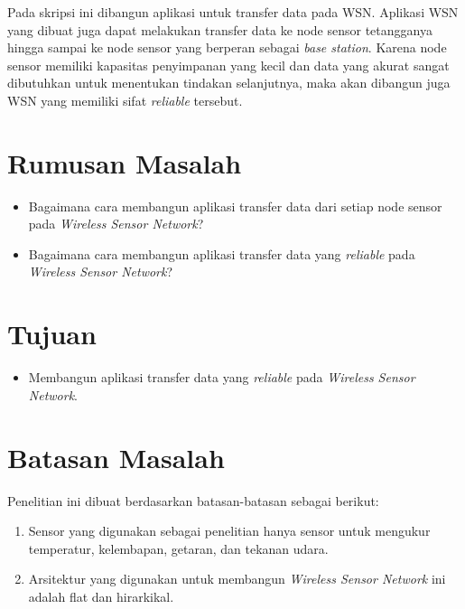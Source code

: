 Pada skripsi ini dibangun aplikasi untuk transfer data pada WSN. Aplikasi WSN yang dibuat juga dapat melakukan transfer data ke node sensor tetangganya hingga sampai ke node sensor yang berperan sebagai \textit{base station}. Karena node sensor memiliki kapasitas penyimpanan yang kecil dan data yang akurat sangat dibutuhkan untuk menentukan tindakan selanjutnya, maka akan dibangun juga WSN yang memiliki sifat \textit{reliable} tersebut.


\section{Rumusan Masalah}
\label{sec:rumusan}
\begin{itemize}
	\item Bagaimana cara membangun aplikasi transfer data dari setiap node sensor pada \textit{Wireless Sensor Network}?
	\item Bagaimana cara membangun aplikasi transfer data yang \textit{reliable} pada \textit{Wireless Sensor Network}?
\end{itemize}

\section{Tujuan}
\label{sec:tujuan}
\begin{itemize}
 \item Membangun aplikasi transfer data yang \textit{reliable} pada \textit{Wireless Sensor Network}.
\end{itemize}

\section{Batasan Masalah}
\label{sec:batasan}
Penelitian ini dibuat berdasarkan batasan-batasan sebagai berikut:
\begin{enumerate}
	\item Sensor yang digunakan sebagai penelitian hanya sensor untuk mengukur temperatur, kelembapan, getaran, dan tekanan udara.
	\item Arsitektur yang digunakan untuk membangun \textit{Wireless Sensor Network} ini adalah flat dan hirarkikal.
\end{enumerate}

